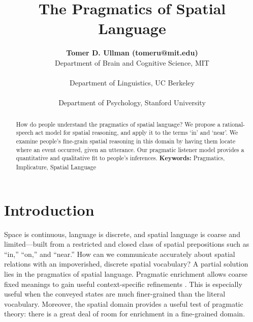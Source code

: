 \documentclass[10pt,letterpaper]{article}
\title{The Pragmatics of Spatial Language}
\author{
{\large \bf Tomer D. Ullman (tomeru@mit.edu)} \\
  Department of Brain and Cognitive Science, MIT\\
  \And{\large \bf Yang Xu (yang\_xu\_ch@berkeley.edu)} \\
  Department of Linguistics, UC Berkeley \\
 \AND{\large \bf Noah D. Goodman (ngoodman@stanford.edu)} \\
  Department of Psychology, Stanford University\\
}
\newcommand{\ndg}[1]{\textcolor{Green}{[ndg: #1]}}
\begin{document}
\maketitle

\begin{abstract}

How do people understand the pragmatics of spatial language? 
We propose a rational-speech act model for spatial reasoning, and apply it to the terms `in' and `near'. We examine people's fine-grain spatial reasoning in this domain by having them locate where an event occurred, given an utterance. Our pragmatic listener model provides a quantitative and qualitative fit to people's inferences. \textbf{Keywords:}
Pragmatics, Implicature, Spatial Language

\end{abstract}

\section{Introduction} 
Space is continuous, language is discrete, and spatial language is coarse and limited---built from a restricted and closed class of spatial prepositions \cite{talmy83,talmy00,landau93} such as ``in,'' ``on,'' and ``near.'' 
How can we communicate accurately about spatial relations with an impoverished, discrete spatial vocabulary?
A partial solution lies in the pragmatics of spatial language.
Pragmatic enrichment allows coarse fixed meanings to gain useful context-specific refinements \cite{grice75,horn84}. This is especially useful when the conveyed states are much finer-grained than the literal vocabulary. Moreover, the spatial domain provides a useful test of pragmatic theory: there is a great deal of room for enrichment in a fine-grained domain.
%
\end{document}
